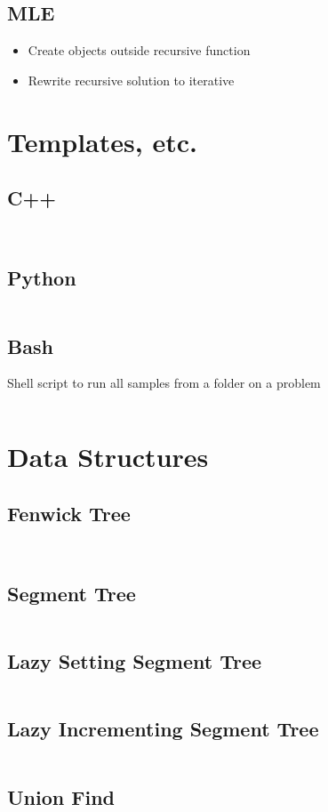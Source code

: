 \documentclass[8pt,a4paper,landscape,oneside]{amsart}
\newcommand{\codec}[1]{\inputminted[fontsize=\large,tabsize=2,baselinestretch=1]{cpp}{code/#1}}
\newcommand{\codep}[1]{\inputminted[fontsize=\large,tabsize=2,baselinestretch=1]{py}{code/#1}}
\newcommand{\codeb}[1]{\inputminted[fontsize=\large,tabsize=2,baselinestretch=1]{bash}{code/#1}}
\begin{document}
\begin{multicols*}{2}
\begin{large}
\subsection{MLE}
\begin{itemize}
    \item Create objects outside recursive function
    \item Rewrite recursive solution to iterative
\end{itemize}
\section{Templates, etc.}
\subsection{C++}
\codec{template.cpp}
\codec{input.cpp}
\subsection{Python}
\codep{template.py}
\subsection{Bash}
Shell script to run all samples from a folder on a problem
\codeb{run.sh}
\section{Data Structures}
\subsection{Fenwick Tree}
\codep{fenwicktree.py}
\codec{fenwicktree.cpp}
\subsection{Segment Tree}
\codep{sgmtree.cpp}
\subsection{Lazy Setting Segment Tree}
\codec{lazysetsgmtree.cpp}
\subsection{Lazy Incrementing Segment Tree}
\codec{lazyincsgmtree.cpp}
\subsection{Union Find}
\codep{unionfind.py}

\end{large}
\end{multicols*}
\end{document}
